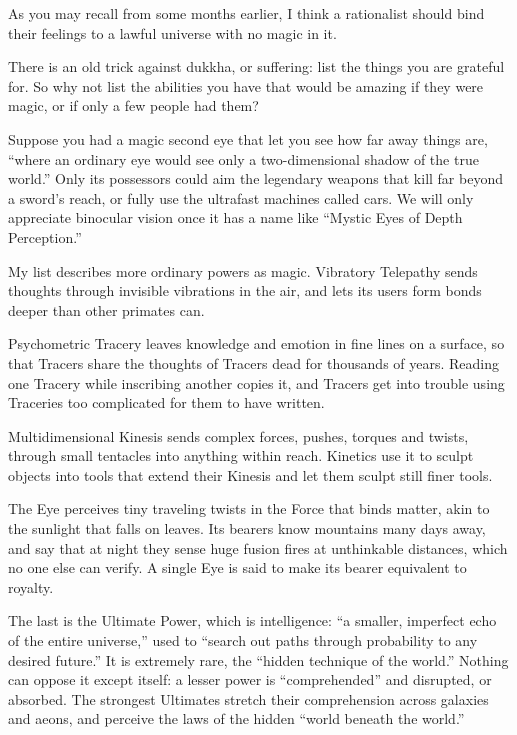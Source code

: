 
As you may recall from some months earlier, I think a rationalist should bind their feelings to a lawful universe with no magic in it. 

There is an old trick against dukkha, or suffering: list the things you are grateful for.  So why not list the abilities you have that would be amazing if they were magic, or if only a few people had them? 

Suppose you had a magic second eye that let you see how far away things are, ``where an ordinary eye would see only a two-dimensional shadow of the true world.'' Only its possessors could aim the legendary weapons that kill far beyond a sword's reach, or fully use the ultrafast machines called cars. We will only appreciate binocular vision once it has a name like ``Mystic Eyes of Depth Perception.''

My list describes more ordinary powers as magic. Vibratory Telepathy sends thoughts through invisible vibrations in the air, and lets its users form bonds deeper than other primates can.

Psychometric Tracery leaves knowledge and emotion in fine lines on a surface, so that Tracers share the thoughts of Tracers dead for thousands of years. Reading one Tracery while inscribing another copies it, and Tracers get into trouble using Traceries too complicated for them to have written.

Multidimensional Kinesis sends complex forces, pushes, torques and twists, through small tentacles into anything within reach. Kinetics use it to sculpt objects into tools that extend their Kinesis and let them sculpt still finer tools.

The Eye perceives tiny traveling twists in the Force that binds matter, akin to the sunlight that falls on leaves. Its bearers know mountains many days away, and say that at night they sense huge fusion fires at unthinkable distances, which no one else can verify. A single Eye is said to make its bearer equivalent to royalty.

The last is the Ultimate Power, which is intelligence: ``a smaller, imperfect echo of the entire universe,'' used to ``search out paths through probability to any desired future.''  It is extremely rare, the ``hidden technique of the world.'' Nothing can oppose it except itself: a lesser power is ``comprehended'' and disrupted, or absorbed. The strongest Ultimates stretch their comprehension across galaxies and aeons, and perceive the laws of the hidden ``world beneath the world.''

